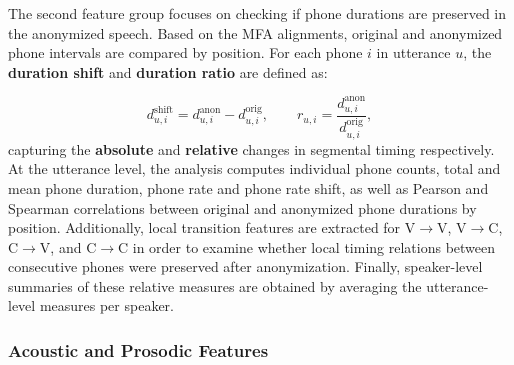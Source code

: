 \documentclass[12pt,leqno,a4paper]{article}
\begin{document}
The second feature group focuses on checking if phone durations are preserved in the anonymized speech. 
Based on the MFA alignments, original and anonymized phone intervals are compared by position. 
For each phone $i$ in utterance $u$, the \textbf{duration shift} and \textbf{duration ratio} are defined as:

\begin{equation}
d_{u,i}^{\mathrm{shift}} = d_{u,i}^{\mathrm{anon}} - d_{u,i}^{\mathrm{orig}},
\qquad
r_{u,i} = \frac{d_{u,i}^{\mathrm{anon}}}{d_{u,i}^{\mathrm{orig}}},
\end{equation}
capturing the \textbf{absolute} and \textbf{relative} changes in segmental timing respectively. At the utterance level, the analysis computes individual phone counts, total and mean phone duration, phone rate and phone rate shift, as well as Pearson and Spearman correlations between original and anonymized phone durations by position. 
Additionally, local transition features are extracted for V$\rightarrow$V, V$\rightarrow$C, C$\rightarrow$V, and C$\rightarrow$C in order to examine whether local timing relations between consecutive phones were preserved after anonymization. 
Finally, speaker-level summaries of these relative measures are obtained by averaging the utterance-level measures per speaker.

\subsubsection{Acoustic and Prosodic Features}
\label{subsec:acoustic_and_prosodic_features}

\end{document}
